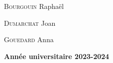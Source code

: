\begin{titlepage}
\begin{center}
\vfill

\noindent\begin{minipage}{0.30\textwidth}
 \begin{flushleft} \large
    \textsc{Bourgouin} Raphaël\\
  \end{flushleft}
\end{minipage}
\hspace{0.02\textwidth}  
\begin{minipage}{0.30\textwidth}
\begin{center} \large
    \textsc{Dumarchat} Joan\\
  \end{center}
\end{minipage}
\hspace{0.02\textwidth}  
\begin{minipage}{0.30\textwidth}
\begin{flushright} \large
    \textsc{Gouedard} Anna\\
  \end{flushright}
\end{minipage}

\vspace{1cm}

{\textbf{\large {Année universitaire} 2023-2024}}

\end{center}
\end{titlepage}
